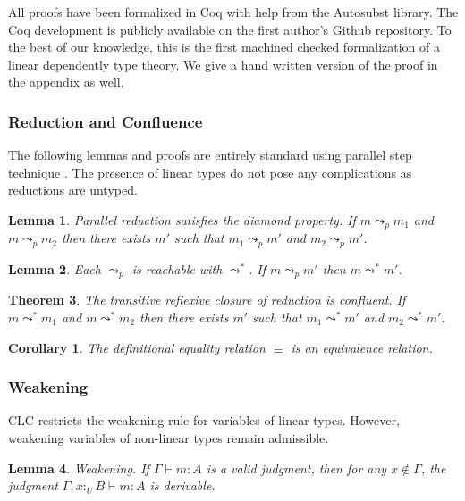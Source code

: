 \documentclass[sigplan,screen,review,authordraft]{acmart}
\newtheorem{theorem}{Theorem}[section]
\newtheorem{corollary}{Corollary}[theorem]
\newtheorem{lemma}[theorem]{Lemma}
\theoremstyle{definition}
\newcommand{\utype}{:_{\scriptscriptstyle U}}
\newcommand{\step}{\leadsto}
\newcommand{\pstep}{\leadsto}
\begin{document}
  All proofs have been formalized in Coq with help from the Autosubst \cite{autosubst} library. The Coq development is publicly available on the first author's Github repository. To the best of our knowledge, this is the first machined checked formalization of a linear dependently type theory. We give a hand written version of the proof in the appendix as well.

  \subsubsection{Reduction and Confluence}

  The following lemmas and proofs are entirely standard using parallel step technique \cite{takahashi}. The presence of linear types do not pose any complications as reductions are untyped.

  \begin{lemma} 
    Parallel reduction satisfies the diamond property. If $m \pstep_p m_1$ and $m \pstep_p m_2$ then there exists $m'$ such that $m_1 \pstep_p m'$ and $m_2 \pstep_p m'$.
  \end{lemma}

  \begin{lemma} 
    Each $\pstep_p$ is reachable with $\step^*$. If $m \pstep_p m'$ then $m \step^* m'$.
  \end{lemma}

  \begin{theorem} 
    The transitive reflexive closure of reduction is confluent. If $m \step^* m_1$ and $m \step^* m_2$ then there exists $m'$ such that $m_1 \pstep^* m'$ and $m_2 \pstep^* m'$.
  \end{theorem}

  \begin{corollary}
    The definitional equality relation $\equiv$ is an equivalence relation.
  \end{corollary}

  \subsubsection{Weakening} \label{weakening}
  CLC restricts the weakening rule for variables of linear types. However, weakening variables of non-linear types remain admissible.

  \begin{lemma} 
    Weakening. If $\Gamma \vdash m : A$ is a valid judgment, then for any $x \notin \Gamma$, the judgment $\Gamma, x \utype B \vdash m : A$ is derivable.
  \end{lemma}
\end{document}
